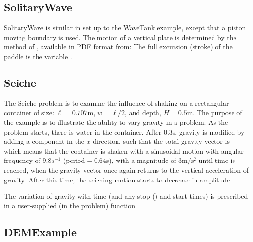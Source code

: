 \documentclass{../GPUSPHtemplate}
\begin{document}
\subsection{SolitaryWave}

SolitaryWave is similar in set up to the WaveTank example, except that a
piston moving boundary is used. The motion of a vertical plate is
determined by the method of \cite{goring_tsunamis_1979}, available in PDF format
from:
The full excursion (stroke) of the paddle is the variable .

\subsection{Seiche}

The Seiche problem is to examine the influence of shaking on a
rectangular container of size: $\ell = 0.707$m, $w = \ell/2$, and depth,
$H = 0.5$m. The purpose of the example is to illustrate the ability to
vary gravity in a problem. As the problem starts, there is water in the
container. After $0.3$s, gravity is modified by adding a component in
the $x$ direction, such that the total gravity vector is
\\ which means that the container is shaken with a sinusoidal
motion with angular frequency of $9.8s^{-1}$ (period${} = 0.64$s),
with a magnitude of $3\text{m}/\text{s}^2$ until time 
is reached, when the gravity vector once again returns to the vertical
acceleration of gravity. After this time, the seiching motion starts to
decrease in amplitude.

\iffalse
\begin{figure}[h]
\centering{%
\texttt{[image: Seiche.png]}%
}
\caption{Resonant seiching in a rectangular domain showing the results
of a time varying gravity in the problem, \cmd{Seiche.cc}. Here the tank has
been shaking side to side at the resonant frequency of $0.638$s. The
color coding is for the pressure in the fluid.}
\end{figure}
\else
\fi

The variation of gravity with time (and any stop () and
start times) is prescribed in a user-supplied (in the problem)
 function.

\subsection{DEMExample}
\end{document}
